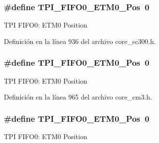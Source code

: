 \subsubsection[{\texorpdfstring{T\+P\+I\+\_\+\+F\+I\+F\+O0\+\_\+\+E\+T\+M0\+\_\+\+Pos}{TPI_FIFO0_ETM0_Pos}}]{\setlength{\rightskip}{0pt plus 5cm}\#define T\+P\+I\+\_\+\+F\+I\+F\+O0\+\_\+\+E\+T\+M0\+\_\+\+Pos~0}\hypertarget{group___c_m_s_i_s___t_p_i_ga48783ce3c695d8c06b1352a526110a87}{}\label{group___c_m_s_i_s___t_p_i_ga48783ce3c695d8c06b1352a526110a87}
T\+PI F\+I\+F\+O0\+: E\+T\+M0 Position 

Definición en la línea 936 del archivo core\+\_\+sc300.\+h.

\subsubsection[{\texorpdfstring{T\+P\+I\+\_\+\+F\+I\+F\+O0\+\_\+\+E\+T\+M0\+\_\+\+Pos}{TPI_FIFO0_ETM0_Pos}}]{\setlength{\rightskip}{0pt plus 5cm}\#define T\+P\+I\+\_\+\+F\+I\+F\+O0\+\_\+\+E\+T\+M0\+\_\+\+Pos~0}\hypertarget{group___c_m_s_i_s___t_p_i_ga48783ce3c695d8c06b1352a526110a87}{}\label{group___c_m_s_i_s___t_p_i_ga48783ce3c695d8c06b1352a526110a87}
T\+PI F\+I\+F\+O0\+: E\+T\+M0 Position 

Definición en la línea 965 del archivo core\+\_\+cm3.\+h.

\subsubsection[{\texorpdfstring{T\+P\+I\+\_\+\+F\+I\+F\+O0\+\_\+\+E\+T\+M0\+\_\+\+Pos}{TPI_FIFO0_ETM0_Pos}}]{\setlength{\rightskip}{0pt plus 5cm}\#define T\+P\+I\+\_\+\+F\+I\+F\+O0\+\_\+\+E\+T\+M0\+\_\+\+Pos~0}\hypertarget{group___c_m_s_i_s___t_p_i_ga48783ce3c695d8c06b1352a526110a87}{}\label{group___c_m_s_i_s___t_p_i_ga48783ce3c695d8c06b1352a526110a87}
T\+PI F\+I\+F\+O0\+: E\+T\+M0 Position 

